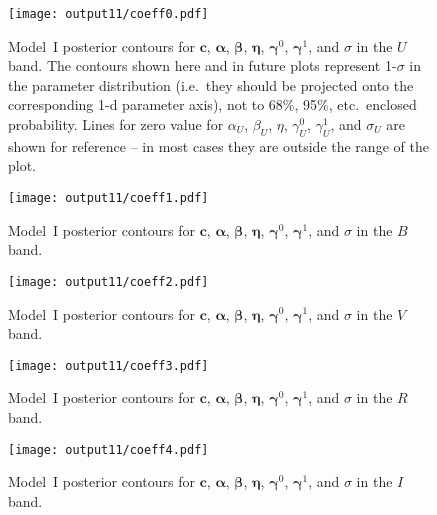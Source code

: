 \documentclass{aastex61}   	%
\begin{document}
\begin{figure}[htbp] %
   \centering
   \texttt{[image: output11/coeff0.pdf]} 
            \caption{Model~I posterior contours for $\mathbf{c}$, $\pmb{\alpha}$, $\pmb{\beta}$, $\pmb{\eta}$, $\pmb{\gamma}^0$, $\pmb{\gamma}^1$, and $\sigma$ in the $U$ band.
            The contours shown here and in future plots represent 1-$\sigma$ in the parameter distribution (i.e.\ they should be
            projected onto the corresponding 1-d parameter axis), not to 68\%, 95\%, etc.\
            enclosed probability.  Lines for zero value for $\alpha_U$, $\beta_U$, $\eta$, $\gamma_U^0$, $\gamma_U^1$, and $\sigma_U$ are shown for reference --
            in most cases they are outside the range of the plot.
            \label{global1:fig}}
\end{figure}

\begin{figure}[htbp] %
   \centering
   \texttt{[image: output11/coeff1.pdf]} 
            \caption{Model~I posterior contours for $\mathbf{c}$, $\pmb{\alpha}$, $\pmb{\beta}$, $\pmb{\eta}$,  $\pmb{\gamma}^0$, $\pmb{\gamma}^1$, and $\sigma$ in the $B$ band.
 \label{global2:fig}}
\end{figure}

\begin{figure}[htbp] %
   \centering
   \texttt{[image: output11/coeff2.pdf]} 
            \caption{Model~I posterior contours for $\mathbf{c}$, $\pmb{\alpha}$, $\pmb{\beta}$, $\pmb{\eta}$, $\pmb{\gamma}^0$, $\pmb{\gamma}^1$, and $\sigma$ in the $V$ band.
 \label{global3:fig}}
\end{figure}

\begin{figure}[htbp] %
   \centering
      \texttt{[image: output11/coeff3.pdf]} 
            \caption{Model~I posterior contours for  $\mathbf{c}$, $\pmb{\alpha}$, $\pmb{\beta}$, $\pmb{\eta}$,  $\pmb{\gamma}^0$, $\pmb{\gamma}^1$, and $\sigma$ in the $R$ band.
 \label{global4:fig}}
\end{figure}

\begin{figure}[htbp] %
   \centering
         \texttt{[image: output11/coeff4.pdf]} 
            \caption{Model~I posterior contours for  $\mathbf{c}$, $\pmb{\alpha}$, $\pmb{\beta}$, $\pmb{\eta}$, $\pmb{\gamma}^0$, $\pmb{\gamma}^1$, and $\sigma$ in the $I$ band.
 \label{global5:fig}}
\end{figure}
\end{document}
